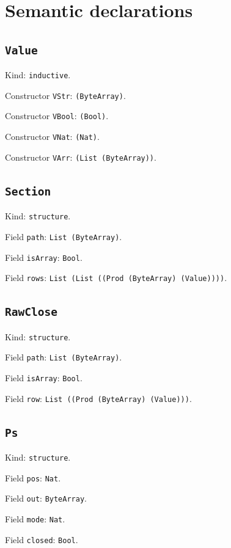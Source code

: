 \documentclass[11pt]{article}
\begin{document}
\section*{Semantic declarations}
\subsection*{\texttt{Value}}
\noindent Kind: \texttt{inductive}.\par
\noindent Constructor \texttt{VStr}: \texttt{(ByteArray)}.\par
\noindent Constructor \texttt{VBool}: \texttt{(Bool)}.\par
\noindent Constructor \texttt{VNat}: \texttt{(Nat)}.\par
\noindent Constructor \texttt{VArr}: \texttt{(List (ByteArray))}.\par
\subsection*{\texttt{Section}}
\noindent Kind: \texttt{structure}.\par
\noindent Field \texttt{path}: \texttt{List (ByteArray)}.\par
\noindent Field \texttt{isArray}: \texttt{Bool}.\par
\noindent Field \texttt{rows}: \texttt{List (List ((Prod (ByteArray) (Value))))}.\par
\subsection*{\texttt{RawClose}}
\noindent Kind: \texttt{structure}.\par
\noindent Field \texttt{path}: \texttt{List (ByteArray)}.\par
\noindent Field \texttt{isArray}: \texttt{Bool}.\par
\noindent Field \texttt{row}: \texttt{List ((Prod (ByteArray) (Value)))}.\par
\subsection*{\texttt{Ps}}
\noindent Kind: \texttt{structure}.\par
\noindent Field \texttt{pos}: \texttt{Nat}.\par
\noindent Field \texttt{out}: \texttt{ByteArray}.\par
\noindent Field \texttt{mode}: \texttt{Nat}.\par
\noindent Field \texttt{closed}: \texttt{Bool}.\par
\end{document}
